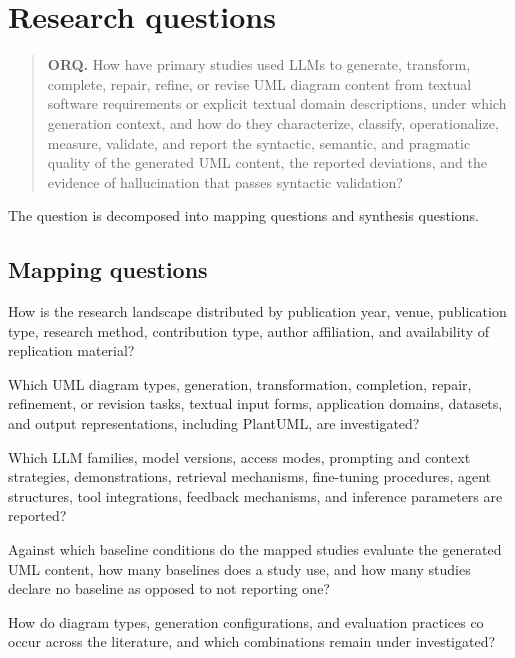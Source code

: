 \section{Research questions}
\label{sec:protocol_questions}

\begin{quote}
\textbf{ORQ.} How have primary studies used LLMs to generate, transform, complete, repair, refine, or revise UML diagram content from textual software requirements or explicit textual domain descriptions, under which generation context, and how do they characterize, classify, operationalize, measure, validate, and report the syntactic, semantic, and pragmatic quality of the generated UML content, the reported deviations, and the evidence of hallucination that passes syntactic validation?
\end{quote}

The question is decomposed into mapping questions and synthesis questions.

\subsection{Mapping questions}

\begin{description}[style=nextline,leftmargin=2.0cm,labelwidth=1.5cm]
    \item[MQ1.] How is the research landscape distributed by publication year, venue, publication type, research method, contribution type, author affiliation, and availability of replication material?
    \item[MQ2.] Which UML diagram types, generation, transformation, completion, repair, refinement, or revision tasks, textual input forms, application domains, datasets, and output representations, including PlantUML, are investigated?
    \item[MQ3.] Which LLM families, model versions, access modes, prompting and context strategies, demonstrations, retrieval mechanisms, fine-tuning procedures, agent structures, tool integrations, feedback mechanisms, and inference parameters are reported?
    \item[MQ4.] Against which baseline conditions do the mapped studies evaluate the generated UML content, how many baselines does a study use, and how many studies declare no baseline as opposed to not reporting one?
    \item[MQ5.] How do diagram types, generation configurations, and evaluation practices co occur across the literature, and which combinations remain under investigated?
\end{description}

